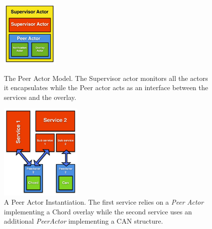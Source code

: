 \begin{figure}
  \begin{minipage}[c]{.35\linewidth}
	\vspace*{.5cm}
   \hspace*{-0.5cm}
      	\centering \includegraphics[width=2.8cm]{./FIGS/PeerActor.pdf}
   \hspace*{0.5cm}
	\vspace*{.5cm}
		\caption{The Peer Actor Model. The Supervisor actor monitors all the actors it encapsulates while the Peer actor acts as an interface between the services and the overlay.}
\label{fig:supervisor}
   \end{minipage}
\hspace*{0.6cm}
   \begin{minipage}[c]{.55\linewidth}
   	\centering \includegraphics[width=4cm]{./FIGS/PeerActorServices.pdf}
	\vspace*{-0.25cm}
		\caption{A Peer Actor Instantiation. The first service relies on a \emph{Peer Actor} implementing a Chord
overlay while the second service uses an additional \emph{PeerActor} implementing a CAN structure.}
		\label{fig:peeractor} 
  \end{minipage} \hfill
	\vspace*{-0.4cm}
\end{figure}

